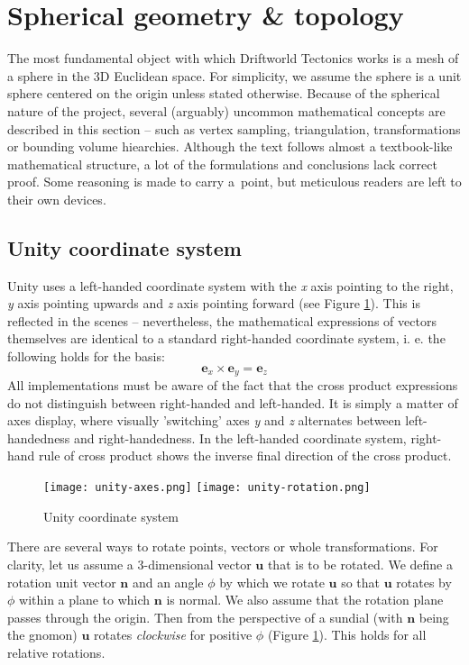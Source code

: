 \section{Spherical geometry \& topology}
\label{sec:geometry}
The most fundamental object with which Driftworld Tectonics works is a mesh of a sphere in the 3D Euclidean space. For simplicity, we assume the sphere is a unit sphere centered on the origin unless stated otherwise. Because of the spherical nature of the project, several (arguably) uncommon mathematical concepts are described in this section -- such as vertex sampling, triangulation, transformations or bounding volume hiearchies. Although the text follows almost a textbook-like mathematical structure, a lot of the formulations and conclusions lack correct proof. Some reasoning is made to carry a~point, but meticulous readers are left to their own devices.
\subsection{Unity coordinate system}
\label{subsec:unitycoords}
Unity uses a left-handed coordinate system with the \textit{x} axis pointing to the right, \textit{y} axis pointing upwards and \textit{z} axis pointing forward (see Figure \ref{fig:unity-coordinate}). This is reflected in the scenes -- nevertheless, the mathematical expressions of vectors themselves are identical to a standard right-handed coordinate system, i. e. the following holds for the basis:
$$\mathbf{e}_x \times \mathbf{e}_y = \mathbf{e}_z$$
All implementations must be aware of the fact that the cross product expressions do not distinguish between right-handed and left-handed. It is simply a matter of axes display, where visually 'switching' axes \textit{y} and \textit{z} alternates between left-handedness and right-handedness. In the left-handed coordinate system, right-hand rule of cross product shows the inverse final direction of the cross product.
\begin{figure}[ht]
\centering
\texttt{[image: unity-axes.png]}
\texttt{[image: unity-rotation.png]}
\caption{Unity coordinate system}
\label{fig:unity-coordinate}
\end{figure}

There are several ways to rotate points, vectors or whole transformations. For clarity, let us assume a 3-dimensional vector $\mathbf{u}$ that is to be rotated. We define a rotation unit vector $\mathbf{n}$ and an angle $\phi$ by which we rotate $\mathbf{u}$ so that $\mathbf{u}$ rotates by $\phi$ within a plane to which $\mathbf{n}$ is normal. We also assume that the rotation plane passes through the origin. Then from the perspective of a sundial (with $\mathbf{n}$ being the gnomon) $\mathbf{u}$ rotates \textit{clockwise} for positive $\phi$ (Figure \ref{fig:unity-coordinate}). This holds for all relative rotations.

